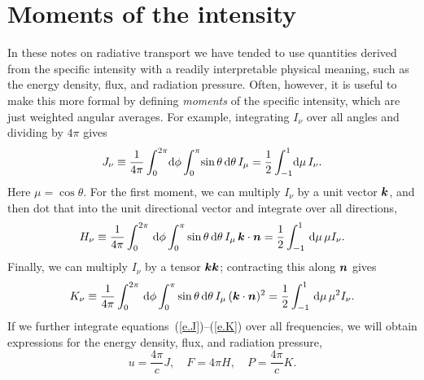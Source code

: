 \chapter{Moments of the intensity}

In these notes on radiative transport we have tended to use quantities derived from the specific intensity with a readily interpretable physical meaning, such as the energy density, flux, and radiation pressure. Often, however, it is useful to make this more formal by defining \emph{moments} of the specific intensity, which are just weighted angular averages.  For example, integrating $I_{\nu}$ over all angles and dividing by $4\pi$ gives
\begin{equation}\label{e.J}
J_{\nu} \equiv \frac{1}{4\pi}\int_{0}^{2\pi}\!\mathrm{d}\phi\int_{0}^{\pi}\!\sin\theta\,\mathrm{d}\theta\, I_{\mu} = \frac{1}{2}\int_{-1}^{1} \!\mathrm{d}\mu \,I_{\nu}.
\end{equation}
Here $\mu = \cos\theta$. For the first moment, we can multiply $I_{\nu}$ by a unit vector $\boldsymbol{k}$, and then dot that into the unit directional vector and integrate over all directions,
\begin{equation}\label{e.H}
H_{\nu} \equiv \frac{1}{4\pi}\int_{0}^{2\pi}\,\mathrm{d}\phi\int_{0}^{\pi}\sin\theta\,\mathrm{d}\theta\, I_{\mu}\,\boldsymbol{k}\cdot\boldsymbol{n} = \frac{1}{2}\int_{-1}^{1} \,\mathrm{d}\mu \,\mu I_{\nu}.
\end{equation}
Finally, we can multiply $I_{\nu}$ by a tensor $\boldsymbol{k}\boldsymbol{k}$; contracting this along $\boldsymbol{n}$ gives
\begin{equation}\label{e.K}
K_{\nu} \equiv \frac{1}{4\pi}\int_{0}^{2\pi}\,\mathrm{d}\phi\int_{0}^{\pi}\sin\theta\,\mathrm{d}\theta\, I_{\mu}\,(\boldsymbol{k}\cdot\boldsymbol{n})^{2} = \frac{1}{2}\int_{-1}^{1} \,\mathrm{d}\mu \,\mu^{2} I_{\nu}.
\end{equation}
If we further integrate equations~(\ref{e.J})--(\ref{e.K}) over all frequencies, we will obtain expressions for the energy density, flux, and radiation pressure,
\begin{equation}\label{e.thermal}
u = \frac{4\pi}{c}J,\quad F = 4\pi H,\quad P = \frac{4\pi}{c}K.
\end{equation}
